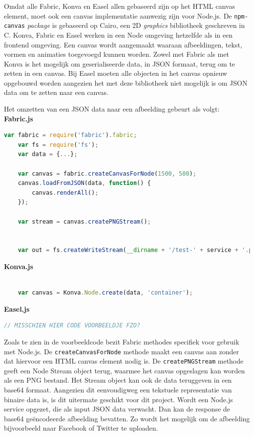Omdat alle Fabric, Konva en Easel allen gebaseerd zijn op het HTML canvas element, moet ook een canvas implementatie aanwezig zijn voor Node.js. De \lstinline{npm-canvas} \textit{package} is gebaseerd op Cairo, een 2D \textit{graphics} bibliotheek geschreven in C. %
Konva, Fabric en Easel werken in een Node omgeving hetzelfde als in een frontend omgeving. Een canvas wordt aangemaakt waaraan afbeeldingen, tekst, vormen en animaties toegevoegd kunnen worden. Zowel met Fabric als met Konva is het mogelijk om geserialiseerde data, in JSON formaat, terug om te zetten in een canvas. Bij Easel moeten alle objecten in het canvas opnieuw opgebouwd worden aangezien het met deze bibliotheek niet mogelijk is om JSON data om te zetten naar een canvas. 

Het omzetten van een JSON data naar een afbeelding gebeurt als volgt:
\textbf{Fabric.js}
\begin{lstlisting}[language=javascript]
	var fabric = require('fabric').fabric;
	var fs = require('fs');
	var data = {...};
	
	var canvas = fabric.createCanvasForNode(1500, 500);
	canvas.loadFromJSON(data, function() {
		canvas.renderAll();
	});
	
	var stream = canvas.createPNGStream();
	
	
	var out = fs.createWriteStream(__dirname + '/test-' + service + '.png');
\end{lstlisting}
\textbf{Konva.js}
\begin{lstlisting}[language=javascript]
	
	var canvas = Konva.Node.create(data, 'container');

\end{lstlisting}
\textbf{Easel.js}
\begin{lstlisting}[language=javascript]
// MISSCHIEN HIER CODE VOORBEELDJE FZO?
\end{lstlisting}

Zoals te zien in de voorbeeldcode bezit Fabric methodes specifiek voor gebruik met Node.js. De \lstinline{createCanvasForNode} methode maakt een canvas aan zonder dat hiervoor een HTML canvas element nodig is. De \lstinline{createPNGStream} methode geeft een Node Stream object terug, waarmee het canvas opgeslagen kan worden als een PNG bestand. Het Stream object kan ook de data teruggeven in een base64 formaat. Aangezien dit eenvoudigweg een tekstuele representatie van binaire data is, is dit uitermate geschikt voor dit project. Wordt een Node.js service opgezet, die als input JSON data verwacht. Dan kan de response de base64 ge\"{e}ncodeerde afbeelding bevatten. Zo wordt het mogelijk om de afbeelding bijvoorbeeld naar Facebook of Twitter te uploaden. 

